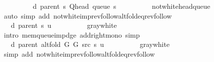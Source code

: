 \begin{isabellebody}
\ \ \ \ \isamarkupfalse%
\ \isamarkupfalse%
\ {\isachardoublequoteopen}{\isachardot}{\kern0pt}{\isachardot}{\kern0pt}{\isachardot}{\kern0pt}\ {\isacharequal}{\kern0pt}\ d\ {\isacharparenleft}{\kern0pt}parent\ s{\isacharparenright}{\kern0pt}\ {\isacharparenleft}{\kern0pt}Q{\isacharunderscore}{\kern0pt}head\ {\isacharparenleft}{\kern0pt}queue\ s{\isacharparenright}{\kern0pt}{\isacharparenright}{\kern0pt}\ {\isacharplus}{\kern0pt}\ {}{\isachardoublequoteclose}\isanewline
\ \ \ \ \ \ \isamarkupfalse%
\ not{\isacharunderscore}{\kern0pt}white{\isacharunderscore}{\kern0pt}head{\isacharunderscore}{\kern0pt}queue\isanewline
\ \ \ \ \ \ \isamarkupfalse%
\ {\isacharparenleft}{\kern0pt}auto\ simp\ add{\isacharcolon}{\kern0pt}\ not{\isacharunderscore}{\kern0pt}white{\isacharunderscore}{\kern0pt}imp{\isacharunderscore}{\kern0pt}rev{\isacharunderscore}{\kern0pt}follow{\isacharunderscore}{\kern0pt}alt{\isacharunderscore}{\kern0pt}fold{\isacharunderscore}{\kern0pt}eq{\isacharunderscore}{\kern0pt}rev{\isacharunderscore}{\kern0pt}follow{\isacharparenright}{\kern0pt}\isanewline
\ \ \ \ \isamarkupfalse%
\ \isamarkupfalse%
\ {\isachardoublequoteopen}{\isachardot}{\kern0pt}{\isachardot}{\kern0pt}{\isachardot}{\kern0pt}\ {\isasymle}\ d\ {\isacharparenleft}{\kern0pt}parent\ s{\isacharparenright}{\kern0pt}\ u\ {\isacharplus}{\kern0pt}\ {}{\isachardoublequoteclose}\isanewline
\ \ \ \ \ \ \isamarkupfalse%
\ gray{\isacharunderscore}{\kern0pt}white\isanewline
\ \ \ \ \ \ \isamarkupfalse%
\ {\isacharparenleft}{\kern0pt}intro\ mem{\isacharunderscore}{\kern0pt}queue{\isacharunderscore}{\kern0pt}imp{\isacharunderscore}{\kern0pt}d{\isacharunderscore}{\kern0pt}ge\ add{\isacharunderscore}{\kern0pt}right{\isacharunderscore}{\kern0pt}mono{\isacharparenright}{\kern0pt}\ simp\isanewline
\ \ \ \ \isamarkupfalse%
\ \isamarkupfalse%
\ {\isachardoublequoteopen}{\isachardot}{\kern0pt}{\isachardot}{\kern0pt}{\isachardot}{\kern0pt}\ {\isacharequal}{\kern0pt}\ d\ {\isacharparenleft}{\kern0pt}parent\ {\isacharparenleft}{\kern0pt}alt{\isacharunderscore}{\kern0pt}fold\ G{}\ G{}\ src\ s{\isacharparenright}{\kern0pt}{\isacharparenright}{\kern0pt}\ u\ {\isacharplus}{\kern0pt}\ {}{\isachardoublequoteclose}\isanewline
\ \ \ \ \ \ \isamarkupfalse%
\ gray{\isacharunderscore}{\kern0pt}white\isanewline
\ \ \ \ \ \ \isamarkupfalse%
\ {\isacharparenleft}{\kern0pt}simp\ add{\isacharcolon}{\kern0pt}\ not{\isacharunderscore}{\kern0pt}white{\isacharunderscore}{\kern0pt}imp{\isacharunderscore}{\kern0pt}rev{\isacharunderscore}{\kern0pt}follow{\isacharunderscore}{\kern0pt}alt{\isacharunderscore}{\kern0pt}fold{\isacharunderscore}{\kern0pt}eq{\isacharunderscore}{\kern0pt}rev{\isacharunderscore}{\kern0pt}follow{\isacharparenright}{\kern0pt}\isanewline

\end{isabellebody}

